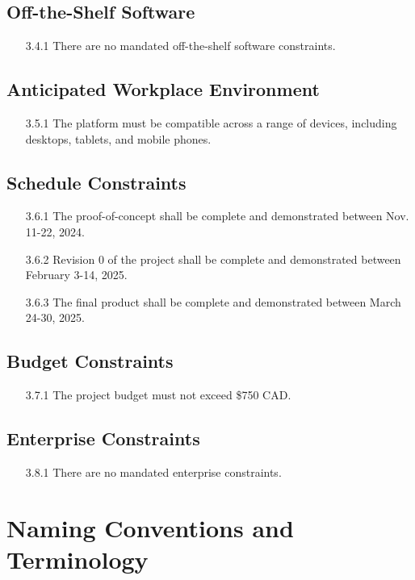 \documentclass[12pt]{article}
\begin{document}
\subsection{Off-the-Shelf Software}
\begin{itemize}
  \item[3.4.1] There are no mandated off-the-shelf software constraints.
\end{itemize}
\subsection{Anticipated Workplace Environment}
\begin{itemize}
  \item[3.5.1] The platform must be compatible across a range of devices, including desktops, tablets, and mobile phones.
\end{itemize}
\subsection{Schedule Constraints}
\begin{itemize}
  \item[3.6.1] The proof-of-concept shall be complete and demonstrated between Nov. 11-22, 2024.
  \item[3.6.2] Revision 0 of the project shall be complete and demonstrated between February 3-14, 2025.
  \item[3.6.3] The final product shall be complete and demonstrated between March 24-30, 2025.
\end{itemize}
\subsection{Budget Constraints}
\begin{itemize}
  \item[3.7.1] The project budget must not exceed \$750 CAD. 
\end{itemize}
\subsection{Enterprise Constraints}
\begin{itemize}
  \item[3.8.1] There are no mandated enterprise constraints.
\end{itemize}

\section{Naming Conventions and Terminology}
\end{document}

